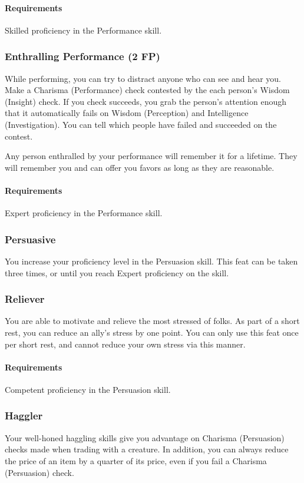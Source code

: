     \paragraph{Requirements} Skilled proficiency in the Performance skill.
\subsubsection{Enthralling Performance (2 FP)} \label{feat::enthrallingperformance}
    While performing, you can try to distract anyone who can see and hear you.
    Make a Charisma (Performance) check contested by the each person's Wisdom (Insight) check.
    If you check succeeds, you grab the person's attention enough that it automatically fails on Wisdom (Perception) and Intelligence (Investigation).
    You can tell which people have failed and succeeded on the contest.

    Any person enthralled by your performance will remember it for a lifetime.
    They will remember you and can offer you favors as long as they are reasonable.
    \paragraph{Requirements} Expert proficiency in the Performance skill.
\subsubsection{Persuasive} \label{feat::persuasive}
    You increase your proficiency level in the Persuasion skill.
    This feat can be taken three times, or until you reach Expert proficiency on the skill.
\subsubsection{Reliever} \label{feat::reliever}
    You are able to motivate and relieve the most stressed of folks.
    As part of a short rest, you can reduce an ally's stress by one point.
    You can only use this feat once per short rest, and cannot reduce your own stress via this manner.
    \paragraph{Requirements} Competent proficiency in the Persuasion skill.
\subsubsection{Haggler} \label{feat::haggler}
    Your well-honed haggling skills give you advantage on Charisma (Persuasion) checks made when trading with a creature.
    In addition, you can always reduce the price of an item by a quarter of its price, even if you fail a Charisma (Persuasion) check.

